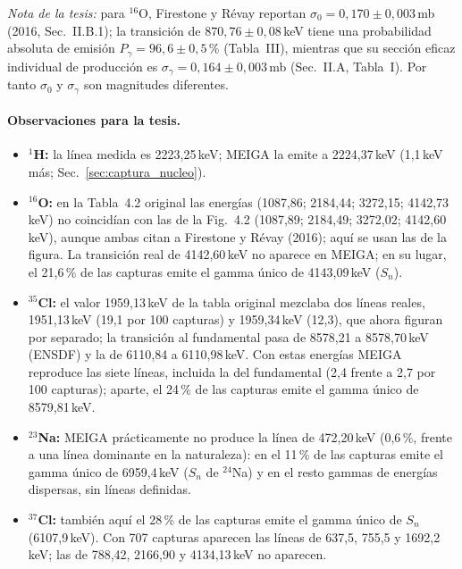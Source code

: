 \documentclass[11pt,a4paper]{article}
\begin{document}
{\small\textit{Nota de la tesis:} para $^{16}$O, Firestone y Révay reportan $\sigma_0 = 0{,}170\pm0{,}003$\,mb (2016, Sec.~II.B.1); la transición de $870{,}76\pm0{,}08$\,keV tiene una probabilidad absoluta de emisión $P_\gamma = 96{,}6\pm0{,}5$\,\%
(Tabla~III), mientras que su sección eficaz individual de producción es $\sigma_\gamma = 0{,}164\pm0{,}003$\,mb (Sec.~II.A, Tabla~I). Por tanto $\sigma_0$ y $\sigma_\gamma$ son magnitudes diferentes.}

\paragraph{Observaciones para la tesis.}
\begin{itemize}
\item \textbf{$^{1}$H:} la línea medida es 2223,25\,keV; MEIGA la emite a 2224,37\,keV (1,1\,keV más; Sec.~\ref{sec:captura_nucleo}).
\item \textbf{$^{16}$O:} en la Tabla~4.2 original las energías (1087,86; 2184,44; 3272,15; 4142,73\,keV) no coincidían con las de la Fig.~4.2 (1087,89; 2184,49; 3272,02; 4142,60\,keV), aunque ambas citan a Firestone y Révay (2016); aquí se usan las de la figura.
La transición real de 4142,60\,keV no aparece en MEIGA; en su lugar, el 21,6\,\% de las capturas emite el gamma único de 4143,09\,keV ($S_n$).
\item \textbf{$^{35}$Cl:} el valor 1959,13\,keV de la tabla original mezclaba dos líneas reales, 1951,13\,keV (19,1 por 100 capturas) y 1959,34\,keV (12,3), que ahora figuran por separado; la transición al fundamental pasa de 8578,21 a 8578,70\,keV (ENSDF)
y la de 6110,84 a 6110,98\,keV. Con estas energías MEIGA reproduce las siete líneas, incluida la del fundamental (2,4 frente a 2,7 por 100 capturas); aparte, el 24\,\% de las capturas emite el gamma único de 8579,81\,keV.
\item \textbf{$^{23}$Na:} MEIGA prácticamente no produce la línea de 472,20\,keV (0,6\,\%, frente a una línea dominante en la naturaleza): en el 11\,\% de las capturas emite el gamma único de 6959,4\,keV ($S_n$ de $^{24}$Na) y en el resto gammas de energías dispersas, sin líneas definidas.
\item \textbf{$^{37}$Cl:} también aquí el 28\,\% de las capturas emite el gamma único de $S_n$ (6107,9\,keV). Con 707 capturas aparecen las líneas de 637,5, 755,5 y 1692,2\,keV; las de 788,42, 2166,90 y 4134,13\,keV no aparecen.
\end{itemize}
\end{document}
